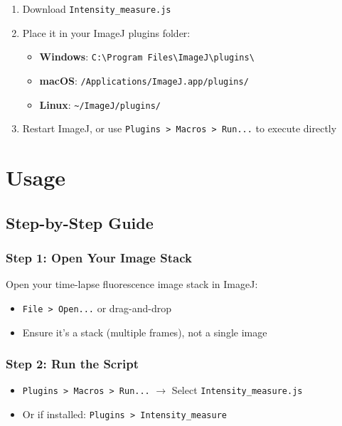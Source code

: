 \documentclass[11pt,a4paper]{article}
\begin{document}
\begin{enumerate}
    \item Download \texttt{Intensity\_measure.js}
    \item Place it in your ImageJ plugins folder:
    \begin{itemize}
        \item \textbf{Windows}: \texttt{C:\textbackslash Program Files\textbackslash ImageJ\textbackslash plugins\textbackslash}
        \item \textbf{macOS}: \texttt{/Applications/ImageJ.app/plugins/}
        \item \textbf{Linux}: \texttt{\textasciitilde/ImageJ/plugins/}
    \end{itemize}
    \item Restart ImageJ, or use \texttt{Plugins > Macros > Run...} to execute directly
\end{enumerate}

\section{Usage}

\subsection{Step-by-Step Guide}

\subsubsection{Step 1: Open Your Image Stack}

Open your time-lapse fluorescence image stack in ImageJ:
\begin{itemize}
    \item \texttt{File > Open...} or drag-and-drop
    \item Ensure it's a stack (multiple frames), not a single image
\end{itemize}

\subsubsection{Step 2: Run the Script}

\begin{itemize}
    \item \texttt{Plugins > Macros > Run...} $\rightarrow$ Select \texttt{Intensity\_measure.js}
    \item Or if installed: \texttt{Plugins > Intensity\_measure}
\end{itemize}
\end{document}
